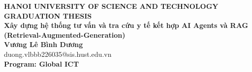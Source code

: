 \documentclass[main.tex]{subfiles}
\begin{document}
\begin{titlepage}
\thispagestyle{empty}
\begin{center}

{\textbf{\large{HANOI UNIVERSITY OF SCIENCE AND TECHNOLOGY}}}\\[3cm]

{\textbf{\huge{GRADUATION THESIS}}}\\[1cm]
{\textbf{\Large{Xây dựng hệ thống tư vấn và tra cứu y tế kết hợp AI Agents và RAG (Retrieval-Augmented-Generation)}}}\\[1cm]

{\textbf{\large{Vương Lê Bình Dương}}}\\
{\large{duong.vlbbb226035@sis.hust.edu.vn}}\\[0.5cm]

{\textbf{\large{Program: Global ICT}}}\\

\vspace{2.5cm}
\begin{table}[H]
\centering
{}
\end{table}
\end{center}



\end{titlepage}
\end{document}
